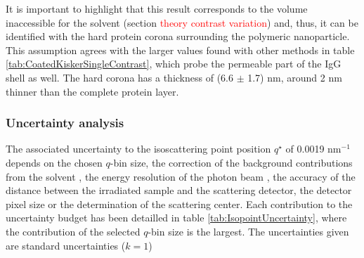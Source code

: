 It is important to highlight that this result corresponds to the volume inaccessible for the solvent (section \textcolor{red}{theory contrast variation}) and, thus, it can be identified with the hard protein corona surrounding the polymeric nanoparticle. This assumption agrees with the larger values found with other methods in table \ref{tab:CoatedKiskerSingleContrast}, which probe the permeable part of the IgG shell as well. The hard corona has a thickness of (6.6 $\pm$ 1.7) nm, around 2 nm thinner than the complete protein layer.

\subsubsection{Uncertainty analysis}
The associated uncertainty to the isoscattering point position $q^{\star}$ of 0.0019 nm$^{-1}$ depends on the chosen $q$-bin size, the correction of the background contributions from the solvent \cite{garcia-diez_nanoparticle_2015}, the energy resolution of the photon beam \cite{krumrey_high-accuracy_2001}, the accuracy of the distance between the irradiated sample and the scattering detector, the detector pixel size \cite{wernecke_characterization_2014-1} or the determination of the scattering center. Each contribution to the uncertainty budget has been detailled in table \ref{tab:IsopointUncertainty}, where the contribution of the selected $q$-bin size is the largest. The uncertainties given are standard uncertainties ($k = 1$)

